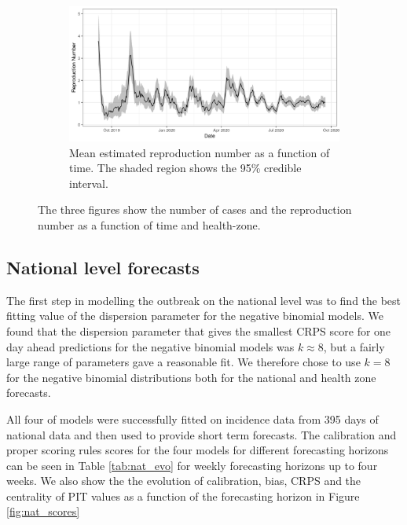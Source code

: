 \documentclass[12pt]{article}
\begin{document}
\begin{figure}[h!]
\bigskip

\begin{subfigure}{\textwidth}
  \centering
  \includegraphics[width=\textwidth]{../output/nat_Rs.png}
  \caption{Mean estimated reproduction number as a function of time. The shaded region shows the 95\% credible interval.}
  \label{fig:rep_num}
\end{subfigure}
\caption{The three figures show the number of cases and the reproduction number as a function of time and health-zone.}
\label{fig:nat_outbreak}
\end{figure}

\subsection{National level forecasts}
The first step in modelling the outbreak on the national level was to find the best fitting value of the dispersion parameter for the negative binomial models. We found that the dispersion parameter that gives the smallest CRPS score for one day ahead predictions for the negative binomial models was $k\approx8$, but a fairly large range of parameters gave a reasonable fit. We therefore chose to use $k=8$ for the negative binomial distributions both for the national and health zone forecasts.

All four of models were successfully fitted on incidence data from 395 days of national data and then used to provide short term forecasts. The calibration and proper scoring rules scores for the four models for different forecasting horizons can be seen in Table \ref{tab:nat_evo} for weekly forecasting horizons up to four weeks. We also show the the evolution of calibration, bias, CRPS and the centrality of PIT values as a function of the forecasting horizon in Figure \ref{fig:nat_scores}

\end{document}
